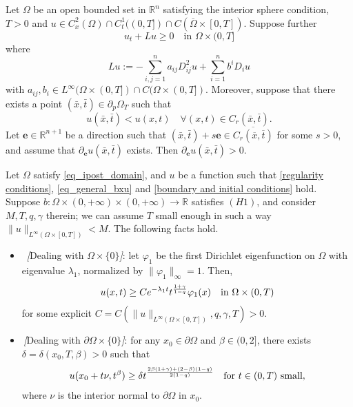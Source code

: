 \documentclass[10pt,a4paper]{amsart}
\newcommand{\Omegabar}{\overline{\Omega}}
\newcommand{\R}{\mathbb{R}}
\def\norm#1{\|#1\|}
\begin{document}
\begin{lemma}
\label{Hopf lemma in parabolic case} 	
Let $\Omega$ be an open bounded set in $\R^n$ satisfying the interior sphere condition, $T>0$ and $u\in C^2_x(\Omega)\cap C^1_t((0,T])\cap C(\Omegabar\times[0,T])$.
	Suppose further
	\[ u_t+Lu\geq 0 \quad \text{in }\Omega\times(0,T]\]
	where \[Lu:=-\sum\limits_{i,j=1}^{n}a_{ij} D^2_{ij}u+\sum\limits_{i=1}^{n}b^iD_{i}u\] 
	with $a_{ij}, b_i \in L^{\infty}(\Omega\times(0,T])\cap C(\Omega\times(0,T])$. 
	Moreover, suppose that there exists a point $(\bar{x},\bar{t})\in \partial_p\Omega_T$ such that
	\[ u(\bar{x},\bar{t})<u(x,t)\quad \forall (x,t)\in C_r(\bar{x},\bar{t}). \]
	Let $\mathbf{e}\in \R^{n+1}$ be a direction such that $(\bar{x},\bar{t})+s\mathbf{e}\in \overline{C_r(\overline{x},\overline{t})}$ for some $s>0$, and assume that $\partial_{\mathbf{e}} u (\bar{x},\bar{t})$ exists. 
	Then $\partial_{\mathbf{e}} u (\bar{x},\bar{t})>0$.
\end{lemma}

\begin{lemma}
\label{lem_behav_boundar_omega}
\label{lem_behav_t=0}
Let $\Omega$ satisfy \eqref{eq_ipost_domain}, and $u$ be a function such that \eqref{regularity conditions}, \eqref{eq_general_bxu} and \eqref{boundary and initial conditions} hold.
Suppose 	
$b\colon\Omega\times(0,+\infty) \times (0,+\infty)\to \R$ satisfies \hyperlink{H1}{\( (H1) \)}, and consider $M, T, q,\gamma$ therein; we can assume $T$ small enough in such a way $\norm{u}_{L^{\infty}(\Omega\times[0,T])}<M$.
 The following facts hold.

\begin{itemize}

\item[(i)] $\,$ \emph{[}Dealing with $ \Omega \times \{0\}$\emph{]}:
let $\varphi_1$ be the first Dirichlet eigenfunction on $\Omega$ with eigenvalue $\lambda_1$, normalized by $\norm{\varphi_1}_{\infty}=1$. 
Then, $$u(x,t) \geq C e^{-\lambda_1 t} t^{\frac{1+\gamma}{1-q}}\varphi_1(x) \quad \hbox{in $\Omega \times (0,T)$}$$
for some explicit $C=C(\norm{u}_{L^{\infty}(\Omega \times [0,T])}, q, \gamma, T)>0$. 

\item[(ii)] $\,$\emph{[}Dealing with $\partial \Omega \times \{0\}$\emph{]}:
for any $x_0 \in \partial \Omega$ and $\beta \in (0,2]$, there exists $\delta=\delta(x_0,T, \beta)>0$ such that
$$u(x_0+t\nu,t^{\beta})\geq \delta t^{\frac{2\beta(1+\gamma)+(2-\beta)(1-q) }{2(1-q)}} \quad \hbox{for $t\in (0,T)$ small},$$
where $\nu$ is the interior normal to $\partial \Omega$ in $x_0$. 
\end{itemize}
\end{lemma}
\end{document}
